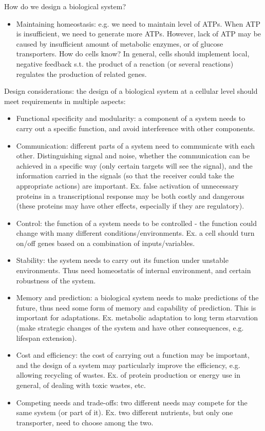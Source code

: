\documentclass{report}
\begin{document}
How do we design a biological system? 
\begin{itemize}
	\item Maintaining homeostasis: e.g. we need to maintain level of ATPs. When ATP is insufficient, we need to generate more ATPs. However, lack of ATP may be caused by insufficient amount of metabolic enzymes, or of glucose transporters. How do cells know? In general, cells should implement local, negative feedback s.t. the product of a reaction (or several reactions) regulates the production of related genes. 
\end{itemize}

Design considerations: the design of a biological system at a cellular level should meet requirements in multiple aspects: 
\begin{itemize}
\item Functional specificity and modularity: a component of a system needs to carry out a specific function, and avoid interference with other components. 

\item Communication: different parts of a system need to communicate with each other. Distinguishing signal and noise, whether the communication can be achieved in a specific way (only certain targets will see the signal), and the information carried in the signals (so that the receiver could take the appropriate actions) are important. Ex. false activation of unnecessary proteins in a transcriptional response may be both costly and dangerous (these proteins may have other effects, especially if they are regulatory). 

\item Control: the function of a system needs to be controlled - the function could change with many different conditions/environments. Ex. a cell should turn on/off genes based on a combination of inputs/variables. 

\item Stability: the system needs to carry out its function under unstable environments. Thus need homeostatis of internal environment, and certain robustness of the system. 

\item Memory and prediction: a biological system needs to make predictions of the future, thus need some form of memory and capability of prediction. This is important for adaptations. Ex. metabolic adaptation to long term starvation (make strategic changes of the system and have other consequences, e.g. lifespan extension). 

\item Cost and efficiency: the cost of carrying out a function may be important, and the design of a system may particularly improve the efficiency, e.g. allowing recycling of wastes. Ex. of protein production or energy use in general, of dealing with toxic wastes, etc. 

\item Competing needs and trade-offs: two different needs may compete for the same system (or part of it). Ex. two different nutrients, but only one transporter, need to choose among the two. 
\end{itemize}
\end{document}
